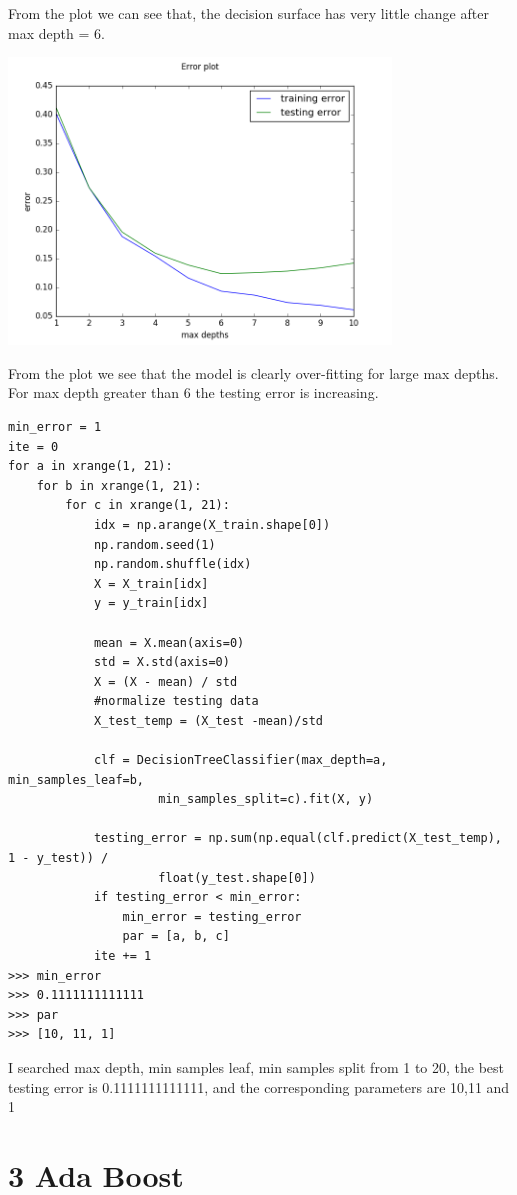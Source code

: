 \documentclass{article}
\newenvironment{problem}[2][$\bullet$]{\begin{trivlist}\large
		\item[\hskip \labelsep {\bfseries #1}\hskip \labelsep {\bfseries #2.}]}  {\end{trivlist}}
\newenvironment{sub}[2][$-$]{\begin{trivlist}
		\item[\hskip \labelsep {\bfseries #1}\hskip \labelsep {\bfseries #2.}]}  {\end{trivlist}}
\begin{document}
From the plot we can see that, the decision surface has very little change after max depth = 6.


\begin{sub}{2.1.3}
\end{sub}

\begin{center}
\includegraphics[width = 4in]{2_1_3}
\end{center}

From the plot we see that the model is clearly over-fitting for large max depths. For max depth greater than 6 the testing error is increasing.  

\begin{sub}{2.1.4}
\end{sub}

\begin{verbatim}
min_error = 1
ite = 0
for a in xrange(1, 21):
    for b in xrange(1, 21):
        for c in xrange(1, 21):
            idx = np.arange(X_train.shape[0])
            np.random.seed(1)
            np.random.shuffle(idx)
            X = X_train[idx]
            y = y_train[idx]

            mean = X.mean(axis=0)
            std = X.std(axis=0)
            X = (X - mean) / std
            #normalize testing data
            X_test_temp = (X_test -mean)/std

            clf = DecisionTreeClassifier(max_depth=a, min_samples_leaf=b,
            		 min_samples_split=c).fit(X, y)

            testing_error = np.sum(np.equal(clf.predict(X_test_temp), 1 - y_test)) /
            		 float(y_test.shape[0])
            if testing_error < min_error:
                min_error = testing_error
                par = [a, b, c]
            ite += 1
>>> min_error
>>> 0.1111111111111
>>> par
>>> [10, 11, 1]
\end{verbatim}
I searched max depth, min samples leaf, min samples split from 1 to 20, the best testing error is  0.1111111111111, and the corresponding parameters are 10,11 and 1

\section{3 Ada Boost}
\begin{problem}{3.1 Implementation}
\end{problem}
\end{document}
